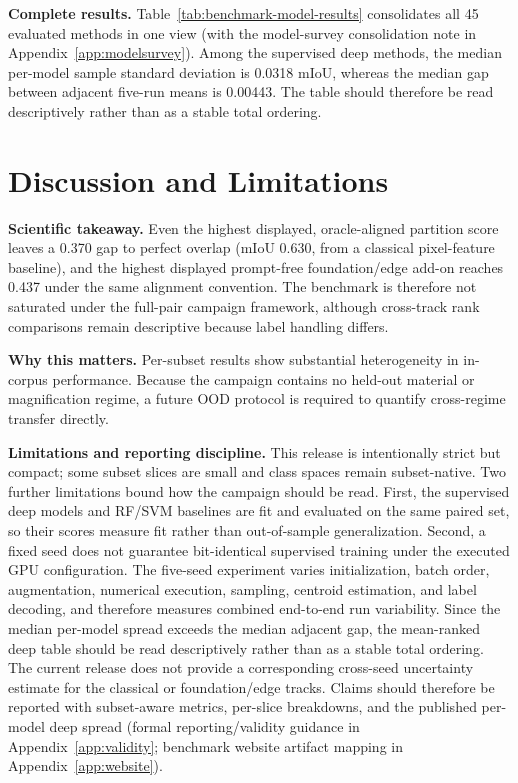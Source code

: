 \documentclass{article}
\begin{document}
\textbf{Complete results.} Table~\ref{tab:benchmark-model-results}
consolidates all 45 evaluated methods in one view (with the model-survey
consolidation note in Appendix~\ref{app:modelsurvey}). Among the supervised
deep methods, the median per-model sample standard deviation is 0.0318 mIoU,
whereas the median gap between adjacent five-run means is 0.00443. The table
should therefore be read descriptively rather than as a stable total ordering.



\section{Discussion and Limitations}
\textbf{Scientific takeaway.} Even the highest displayed, oracle-aligned
partition score leaves a 0.370 gap to perfect overlap (mIoU 0.630, from a
classical pixel-feature baseline), and the highest displayed prompt-free
foundation/edge add-on reaches 0.437 under the same alignment convention. The
benchmark is therefore not saturated under the full-pair campaign framework,
although cross-track rank comparisons remain descriptive because label
handling differs.

\textbf{Why this matters.} Per-subset results show substantial heterogeneity in
in-corpus performance. Because the campaign contains no held-out material or
magnification regime, a future OOD protocol is required to quantify
cross-regime transfer directly.

\textbf{Limitations and reporting discipline.} This release is intentionally
strict but compact; some subset slices are small and class spaces remain
subset-native. Two further limitations bound how the campaign should be read.
First, the supervised deep models and RF/SVM baselines are fit and evaluated on
the same paired set, so their scores measure fit rather than out-of-sample
generalization. Second, a fixed seed does not guarantee bit-identical
supervised training under the executed GPU configuration. The five-seed
experiment varies initialization, batch order, augmentation, numerical
execution, sampling, centroid estimation, and label decoding, and therefore
measures combined end-to-end run variability. Since the median per-model
spread exceeds the median adjacent gap, the mean-ranked deep table should be
read descriptively rather than as a stable total ordering. The current release
does not provide a corresponding cross-seed uncertainty estimate for the
classical or foundation/edge tracks. Claims should therefore be reported with
subset-aware metrics, per-slice breakdowns, and the published per-model deep
spread (formal
reporting/validity guidance in Appendix~\ref{app:validity}; benchmark website
artifact mapping in Appendix~\ref{app:website}).
\end{document}
